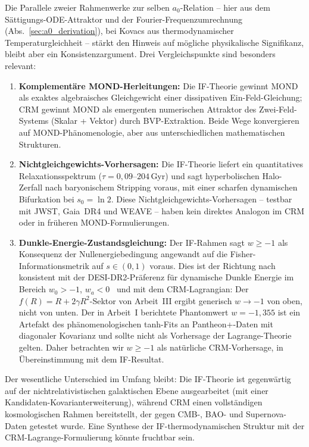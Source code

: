 \documentclass[aps,prd,twocolumn,superscriptaddress,nofootinbib]{revtex4-2}
\begin{document}
Die Parallele zweier Rahmenwerke zur selben $a_0$-Relation -- hier aus dem S\"attigungs-ODE-Attraktor und der Fourier-Frequenzumrechnung (Abs.~\ref{sec:a0_derivation}), bei Kovacs aus thermodynamischer Temperaturgleichheit -- st\"arkt den Hinweis auf m\"ogliche physikalische Signifikanz, bleibt aber ein Konsistenzargument. Drei Vergleichspunkte sind besonders relevant:

\begin{enumerate}
\item \textbf{Komplement\"are MOND-Herleitungen:} Die IF-Theorie gewinnt MOND als exaktes algebraisches Gleichgewicht einer dissipativen Ein-Feld-Gleichung; CRM gewinnt MOND als emergenten numerischen Attraktor des Zwei-Feld-Systems (Skalar + Vektor) durch BVP-Extraktion. Beide Wege konvergieren auf MOND-Ph\"anomenologie, aber aus unterschiedlichen mathematischen Strukturen.

\item \textbf{Nichtgleichgewichts-Vorhersagen:} Die IF-Theorie liefert ein quantitatives Relaxationsspektrum ($\tau = 0{,}09$--$204$\,Gyr) und sagt hyperbolischen Halo-Zerfall nach baryonischem Stripping voraus, mit einer scharfen dynamischen Bifurkation bei $s_0 = \ln 2$. Diese Nichtgleichgewichts-Vorhersagen -- testbar mit JWST, Gaia~DR4 und WEAVE -- haben kein direktes Analogon im CRM oder in fr\"uheren MOND-Formulierungen.

\item \textbf{Dunkle-Energie-Zustandsgleichung:} Der IF-Rahmen sagt $w \geq -1$ als Konsequenz der Nullenergiebedingung angewandt auf die Fisher-Informationsmetrik auf $s \in (0,1)$ voraus. Dies ist der Richtung nach konsistent mit der DESI-DR2-Pr\"aferenz f\"ur dynamische Dunkle Energie im Bereich $w_0>-1$, $w_a<0$~\cite{DESI2025} und mit dem CRM-Lagrangian: Der $f(R) = R + 2\gamma R^2$-Sektor von Arbeit~III ergibt generisch $w \to -1$ von oben, nicht von unten. Der in Arbeit~I berichtete Phantomwert $w = -1{,}355$ ist ein Artefakt des ph\"anomenologischen tanh-Fits an Pantheon+-Daten mit diagonaler Kovarianz und sollte nicht als Vorhersage der Lagrange-Theorie gelten. Daher betrachten wir $w \geq -1$ als nat\"urliche CRM-Vorhersage, in \"Ubereinstimmung mit dem IF-Resultat.
\end{enumerate}

Der wesentliche Unterschied im Umfang bleibt: Die IF-Theorie ist gegenw\"artig auf der nichtrelativistischen galaktischen Ebene ausgearbeitet (mit einer Kandidaten-Kovarianterweiterung), w\"ahrend CRM einen vollst\"andigen kosmologischen Rahmen bereitstellt, der gegen CMB-, BAO- und Supernova-Daten getestet wurde. Eine Synthese der IF-thermodynamischen Struktur mit der CRM-Lagrange-Formulierung k\"onnte fruchtbar sein.
\end{document}
